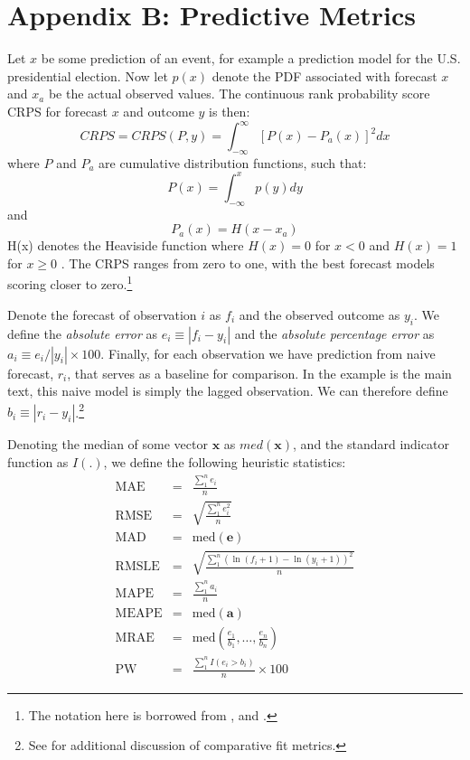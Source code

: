 \documentclass[12pt,fullpage,endnotes]{article}
\begin{document}
 \section*{Appendix B: Predictive Metrics}
Let $x$ be some prediction of an event, for example a prediction model for the U.S. presidential election. Now let $p(x)$ denote the PDF associated with forecast $x$ and $x_a$ be the actual observed values. The continuous rank probability score CRPS for forecast $x$ and outcome $y$ is then:
\begin{equation}
CRPS=CRPS(P,y)=\int^{\infty}_{-\infty} [P(x)-P_a(x)]^2 dx
\end{equation}
where $P$ and $P_a$ are cumulative distribution functions, such that:
\begin{equation}
P(x)=\int^{x}_{-\infty} p(y) dy
\end{equation}
and 
\begin{equation}
P_a(x)=H(x-x_a)
\end{equation}
H(x) denotes the Heaviside function where $H(x)=0$ for $x<0$ and $H(x)=1$ for $x\geq0$ \citep{Hersbach:2000}. The CRPS ranges from zero to one, with the best forecast models scoring closer to zero.\footnote{The notation here is borrowed from \citet{Hersbach:2000}, and \citet{GneitingEtAl:2007}.}

Denote the forecast of observation $i$ as $f_i$ and the observed
outcome as $y_i$.  We define the \textit{absolute error} as $e_i\equiv |f_i - y_i|$ and the \textit{absolute percentage error} as $a_i \equiv e_i / |y_i| \times 100$.  Finally, for each observation we have prediction from naive forecast, $r_i$, that serves as a baseline for comparison.  In the example is the main text, this naive model is simply the lagged observation.  We can therefore define $b_i \equiv |r_i - y_i|$.\footnote{See \citet{brandt:freeman:schrodt:2011} for additional discussion of comparative fit metrics.}

Denoting the median of some vector $\mathbf{x}$ as $med(\mathbf{x})$, and the standard indicator function as $I(.)$, we define the following heuristic statistics:
 \begin{eqnarray*}
 \mathrm{MAE} &=& \frac{\sum_1^n{e_i}}{n}\\
  \mathrm{RMSE} &=& \sqrt{\frac{\sum_1^n{e^2_i}}{n}} \\
  \mathrm{MAD} &=& \mathrm{med}(\mathbf{e}) \\
  \mathrm{RMSLE} &=& \sqrt{\frac{\sum_1^n\left(\ln(f_i+1) - \ln(y_i+1)  \right)^2}{n}} \\
  \mathrm{MAPE} &=& \frac{\sum_1^n{a_i}}{n} \\
   \mathrm{MEAPE} &=& \mathrm{med}(\mathbf{a}) \\
 \mathrm{MRAE} &=& \mathrm{med}\left(\frac{e_1}{b_1}, \ldots, \frac{e_n}{b_n} \right) \\
 \mathrm{PW} &=& \frac{\sum_1^nI(e_i > b_i)}{n} \times 100
\end{eqnarray*}
\end{document}
